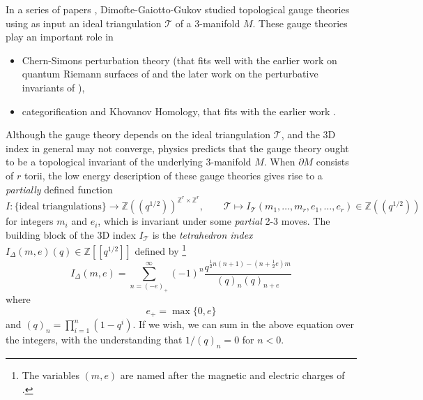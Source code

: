 \documentclass[12pt]{amsart}
\theoremstyle{definition}
\def\BZ{\mathbb Z}
\def\calT{\mathcal T}
\def\longto{\longrightarrow}
\def\pt{\partial}
\def\be{  \begin{equation} }
\def\ee{  \end{equation} }
\def\ID{I_{\Delta}}
\numberwithin{equation}{section}
\begin{document}
In a series of papers \cite{DGG1,DGG2}, Dimofte-Gaiotto-Gukov studied
topological gauge theories using as input an ideal triangulation $\calT$ of 
a 3-manifold $M$. These gauge theories 
play an important role in 
\begin{itemize}
\item Chern-Simons 
perturbation theory (that fits well with the earlier work on
quantum Riemann surfaces of \cite{D1} and the later work on the perturbative 
invariants of \cite{DG}),
\item
categorification and Khovanov Homology, that fits with
the earlier work \cite{Witten-fivebranes}.
\end{itemize}
Although the gauge theory depends on the ideal triangulation $\calT$, 
and the 3D index in general may not converge, physics predicts that the 
gauge theory ought to be a topological invariant of the 
underlying 3-manifold $M$. When $\pt M$ consists of $r$ torii, the low energy 
description of these gauge theories gives rise to a {\em partially} defined 
function
\be
\label{eq.ICT}
I: \{\text{ideal triangulations}\}
\longto \BZ((q^{1/2}))^{\BZ^r \times \BZ^r}, \qquad \calT \mapsto 
I_{\calT}(m_1,\dots,m_r,e_1,\dots,e_r) \in \BZ((q^{1/2}))
\ee
for integers $m_i$ and $e_i$, which is invariant under some {\em partial} 
2-3 moves. The building block of the 3D index $I_{\calT}$
is the {\em tetrahedron index $\ID(m,e)(q) \in \BZ[[q^{1/2}]]$} defined by
\footnote{The variables $(m,e)$ are named after the magnetic and electric 
charges of \cite{DGG2}.}
\be
\label{eq.ID}
\ID(m,e)=\sum_{n=(-e)_+}^\infty (-1)^n \frac{q^{\frac{1}{2}n(n+1)
-\left(n+\frac{1}{2}e\right)m}}{(q)_n(q)_{n+e}}
\ee
where
$$
e_+=\max\{0,e\}
$$
and $(q)_n=\prod_{i=1}^n (1-q^i)$. If we wish, we can sum in the above 
equation over the integers, with the understanding that $1/(q)_n=0$ for $n < 0$.
\end{document}
